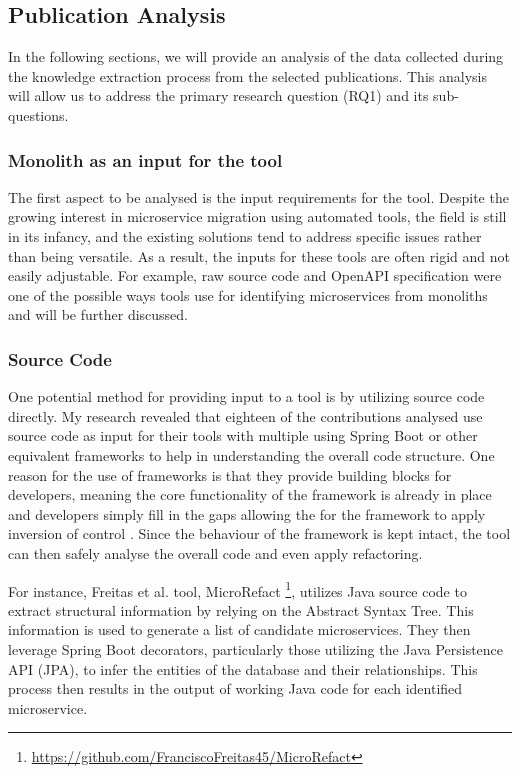 \documentclass[conference]{IEEEtran}
\begin{document}
\subsection{Publication Analysis}

In the following sections, we will provide an analysis of the data collected
during the knowledge extraction process from the selected publications. This
analysis will allow us to address the primary research question (RQ1) and its
sub-questions.

\subsubsection{Monolith as an input for the tool}

The first aspect to be analysed is the input requirements for the tool. Despite
the growing interest in microservice migration using automated tools, the field
is still in its infancy, and the existing solutions tend to address specific
issues rather than being versatile. As a result, the inputs for these tools are
often rigid and not easily adjustable. For example, raw source code and OpenAPI
specification were one of the possible ways tools use for identifying
microservices from monoliths and will be further discussed.

\subsubsection*{Source Code}

One potential method for providing input to a tool is by utilizing source code
directly. My research revealed that eighteen of the contributions analysed use
source code as input for their tools with multiple using Spring Boot or other
equivalent frameworks to help in understanding the overall code structure. One
reason for the use of frameworks is that they provide building blocks for
developers, meaning the core functionality of the framework is already in place
and developers simply fill in the gaps allowing the for the framework to apply
inversion of control \cite{gamma1995design}. Since the behaviour of the
framework is kept intact, the tool can then safely analyse the overall code and
even apply refactoring.

For instance, Freitas et al.  tool, MicroRefact
\footnote{\url{https://github.com/FranciscoFreitas45/MicroRefact}}, utilizes
Java source code to extract structural information by relying on the Abstract
Syntax Tree. This information is used to generate a list of candidate
microservices. They then leverage Spring Boot decorators, particularly those
utilizing the Java Persistence API (JPA), to infer the entities of the database
and their relationships. This process then results in the output of working
Java code for each identified microservice.
\end{document}
